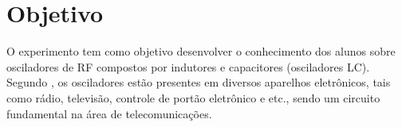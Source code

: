 \newpage

\section{Objetivo}
O experimento tem como objetivo desenvolver o conhecimento dos alunos sobre osciladores de RF compostos por indutores e capacitores (osciladores LC). Segundo  \cite{Couch}, os osciladores estão presentes em diversos aparelhos eletrônicos, tais como rádio, televisão, controle de portão eletrônico e etc., sendo um circuito fundamental na área de telecomunicações. 